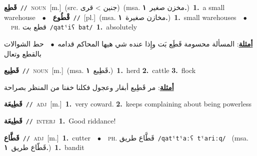 \documentclass[10pt,a4paper,twoside]{article} %
\begin{document}
\begin{multicols}{2}
{\setlength\topsep{0pt}\textbf{\foreignlanguage{arabic}{قَطِع}}\ {\color{gray}\texttt{//}\color{black}}\ \textsc{noun}\ [m.]\ (src. \color{gray}\foreignlanguage{arabic}{جنين > قرى}\color{black})\ \color{gray}(msa. \foreignlanguage{arabic}{مخزن صغير}~\foreignlanguage{arabic}{\textbf{١.}})\color{black}\ \textbf{1.}~a small warehouse\ \ $\bullet$\ \ \setlength\topsep{0pt}\textbf{\foreignlanguage{arabic}{قْطُوع}}\ {\color{gray}\texttt{//}\color{black}}\ [pl.]\ \color{gray}(msa. \foreignlanguage{arabic}{مخازن صغيرة}~\foreignlanguage{arabic}{\textbf{١.}})\color{black}\ \textbf{1.}~small warehouses\ \ $\bullet$\ \ \textsc{ph.} \color{gray} \foreignlanguage{arabic}{قطع بت}\color{black}\ {\color{gray}\texttt{/{\sffamily qatˤiʕ bat}/}\color{black}}\ \textbf{1.}~absolutely\  \begin{flushright}\color{gray}\foreignlanguage{arabic}{\textbf{\underline{\foreignlanguage{arabic}{أمثلة}}}: المسألة محسومة قَطَِع بَت وإِذا عنده شي هيها المحاكم قدامه\ $\bullet$\ \  حط الشوالات بالقطع وتعال}\end{flushright}\color{black}} \vspace{2mm}

{\setlength\topsep{0pt}\textbf{\foreignlanguage{arabic}{قَطِيع}}\ {\color{gray}\texttt{//}\color{black}}\ \textsc{noun}\ [m.]\ \color{gray}(msa. \foreignlanguage{arabic}{قَطِيع}~\foreignlanguage{arabic}{\textbf{١.}})\color{black}\ \textbf{1.}~herd  \textbf{2.}~cattle  \textbf{3.}~flock\  \begin{flushright}\color{gray}\foreignlanguage{arabic}{\textbf{\underline{\foreignlanguage{arabic}{أمثلة}}}: مر قَطِيع أبقار وعجول فكلنا خفنا من المنظر بصراحة}\end{flushright}\color{black}} \vspace{2mm}

{\setlength\topsep{0pt}\textbf{\foreignlanguage{arabic}{قَطِيعَة}}\ {\color{gray}\texttt{//}\color{black}}\ \textsc{adj}\ [m.]\ \textbf{1.}~very coward.  \textbf{2.}~keeps complaining about being powerless\ } \vspace{2mm}

{\setlength\topsep{0pt}\textbf{\foreignlanguage{arabic}{قَطِيعَة}}\ {\color{gray}\texttt{//}\color{black}}\ \textsc{interj}\ \textbf{1.}~Good riddance!\ } \vspace{2mm}

{\setlength\topsep{0pt}\textbf{\foreignlanguage{arabic}{قَطَّاع}}\ {\color{gray}\texttt{//}\color{black}}\ \textsc{adj}\ [m.]\ \textbf{1.}~cutter\ \ $\bullet$\ \ \textsc{ph.} \color{gray} \foreignlanguage{arabic}{قَطَّاع طريق}\color{black}\ {\color{gray}\texttt{/{\sffamily qatˤtˤaːʕ tˤariːq}/}\color{black}}\ \color{gray} (msa. \foreignlanguage{arabic}{قَطّاع طريق}~\foreignlanguage{arabic}{\textbf{١.}})\color{black}\ \textbf{1.}~bandit\ } \vspace{2mm}


\end{multicols}
\end{document}

